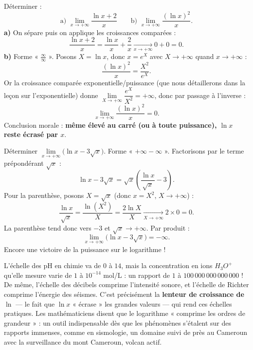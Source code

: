 \documentclass[11pt]{article}
\begin{document}
\begin{exoresolu}
Déterminer :
\[
\text{a) } \lim_{x \to +\infty} \frac{\ln x + 2}{x} \qquad \text{b) } \lim_{x \to +\infty} \frac{(\ln x)^2}{x}.
\]
\tcblower
\textbf{a)} On sépare puis on applique les croissances comparées :
\[
\frac{\ln x + 2}{x} = \frac{\ln x}{x} + \frac{2}{x} \xrightarrow[x \to +\infty]{} 0 + 0 = 0.
\]
\textbf{b)} Forme « $\frac{\infty}{\infty}$ ». Posons $X = \ln x$, donc $x = e^X$ avec $X \to +\infty$ quand $x \to +\infty$ :
\[
\frac{(\ln x)^2}{x} = \frac{X^2}{e^X}.
\]
Or la croissance comparée exponentielle/puissance (que nous détaillerons dans la leçon sur l'exponentielle) donne $\lim\limits_{X \to +\infty} \dfrac{e^X}{X^2} = +\infty$, donc par passage à l'inverse :
\[
\lim_{x \to +\infty} \frac{(\ln x)^2}{x} = 0.
\]
Conclusion morale : \textbf{même élevé au carré (ou à toute puissance), $\ln x$ reste écrasé par $x$}.
\end{exoresolu}

\begin{exoresolu}[Le changement de variable $X = \sqrt{x}$ en action]
Déterminer $\lim\limits_{x \to +\infty} \bigl(\ln x - 3\sqrt{x}\bigr)$.
\tcblower
Forme « $+\infty - \infty$ ». Factorisons par le terme prépondérant $\sqrt{x}$ :
\[
\ln x - 3\sqrt{x} = \sqrt{x}\left(\frac{\ln x}{\sqrt{x}} - 3\right).
\]
Pour la parenthèse, posons $X = \sqrt{x}$ (donc $x = X^2$, $X \to +\infty$) :
\[
\frac{\ln x}{\sqrt{x}} = \frac{\ln(X^2)}{X} = \frac{2\ln X}{X} \xrightarrow[X \to +\infty]{} 2 \times 0 = 0.
\]
La parenthèse tend donc vers $-3$ et $\sqrt{x} \to +\infty$. Par produit :
\[
\lim_{x \to +\infty} \bigl(\ln x - 3\sqrt{x}\bigr) = -\infty.
\]
Encore une victoire de la puissance sur le logarithme !
\end{exoresolu}

\begin{savaistu}
L'échelle des pH en chimie va de $0$ à $14$, mais la concentration en ions $H_3O^+$ qu'elle mesure varie de $1$ à $10^{-14}$ mol/L : un rapport de $1$ à $100\,000\,000\,000\,000$ ! De même, l'échelle des décibels comprime l'intensité sonore, et l'échelle de Richter comprime l'énergie des séismes. C'est précisément la \textbf{lenteur de croissance de $\ln$} — le fait que $\ln x$ « écrase » les grandes valeurs — qui rend ces échelles pratiques. Les mathématiciens disent que le logarithme « comprime les ordres de grandeur » : un outil indispensable dès que les phénomènes s'étalent sur des rapports immenses, comme en sismologie, un domaine suivi de près au Cameroun avec la surveillance du mont Cameroun, volcan actif.
\end{savaistu}
\end{document}
